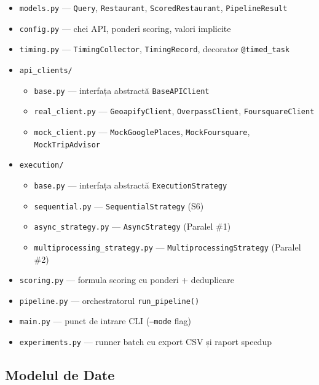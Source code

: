 \documentclass[12pt,a4paper]{article}
\begin{document}
\begin{itemize}[noitemsep]
  \item \texttt{models.py} --- \texttt{Query}, \texttt{Restaurant}, \texttt{ScoredRestaurant}, \texttt{PipelineResult}
  \item \texttt{config.py} --- chei API, ponderi scoring, valori implicite
  \item \texttt{timing.py} --- \texttt{TimingCollector}, \texttt{TimingRecord}, decorator \texttt{@timed\_task}
  \item \texttt{api\_clients/}
    \begin{itemize}[noitemsep]
      \item \texttt{base.py} --- interfața abstractă \texttt{BaseAPIClient}
      \item \texttt{real\_client.py} --- \texttt{GeoapifyClient}, \texttt{OverpassClient}, \texttt{FoursquareClient}
      \item \texttt{mock\_client.py} --- \texttt{MockGooglePlaces}, \texttt{MockFoursquare}, \texttt{MockTripAdvisor}
    \end{itemize}
  \item \texttt{execution/}
    \begin{itemize}[noitemsep]
      \item \texttt{base.py} --- interfața abstractă \texttt{ExecutionStrategy}
      \item \texttt{sequential.py} --- \texttt{SequentialStrategy} (S6)
      \item \texttt{async\_strategy.py} --- \texttt{AsyncStrategy} (Paralel \#1)
      \item \texttt{multiprocessing\_strategy.py} --- \texttt{MultiprocessingStrategy} (Paralel \#2)
    \end{itemize}
  \item \texttt{scoring.py} --- formula scoring cu ponderi + deduplicare
  \item \texttt{pipeline.py} --- orchestratorul \texttt{run\_pipeline()}
  \item \texttt{main.py} --- punct de intrare CLI (\texttt{--mode} flag)
  \item \texttt{experiments.py} --- runner batch cu export CSV și raport speedup
\end{itemize}

\subsection{Modelul de Date}
\end{document}
